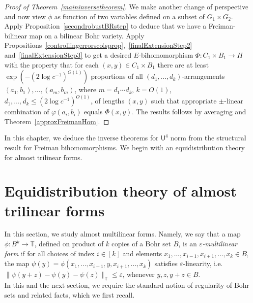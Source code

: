 \documentclass[a4paper,11pt]{article}
\numberwithin{theorem}{section}
\theoremstyle{definition}
\begin{document}
\begin{proof}[Proof of Theorem~\ref{maininversetheorem}]
    We make another change of perspective and now view $\phi$ as function of two variables defined on a subset of $G_1 \times G_2$. Apply Proposition~\ref{secondrobustBRstep} to deduce that we have a Freiman-bilinear map on a bilinear Bohr variety. Apply Propositions~\ref{controllingerrorscolsprop},~\ref{finalExtensionStep2} and~\ref{finalExtensionStep3} to get a desired $E$-bihomomorphism $\Phi : C_1 \times B_1 \to H$ with the property that for each $(x,y) \in C_1 \times B_1$ there are at least $\exp(-(2\log c^{-1})^{O(1)})$ proportions of all $(d_1, \dots, d_k)$-arrangements $(a_1, b_1), \dots, (a_m, b_m)$, where $m = d_1 \cdots d_k$, $k = O(1)$, $d_1, \dots, d_k \leq (2\log c^{-1})^{O(1)}$, of lengths $(x,y)$ such that appropriate $\pm$-linear combination of $\varphi(a_i, b_i)$ equals $\Phi(x,y)$. The results follows by averaging and Theorem~\ref{approxFreimanHom}.
\end{proof}


\pagebreak

\begin{center}
\end{center}\normalsize

In this chapter, we deduce the inverse theorems for $\mathsf{U}^4$ norm from the structural result for Freiman bihomomorphisms. We begin with an equidistribution theory for almost trilinear forms.


\section{Equidistribution theory of almost trilinear forms}\label{sectionequidistributiontheory}

In this section, we study almost multilinear forms. Namely, we say that a map $\phi : B^k \to \mathbb{T}$, defined on product of $k$ copies of a Bohr set $B$, is an \textit{$\varepsilon$-multilinear form} if for all choices of index $i \in [k]$ and elements $x_1, \dots, x_{i-1}, x_{i+1}, \dots, x_k \in B$, the map $\psi(y) = \phi(x_1, \dots, x_{i -1}, y, x_{i + 1}, \dots, x_k)$ satisfies $\varepsilon$-linearity, i.e. $\|\psi(y + z) - \psi(y) - \psi(z)\|_{\mathbb{T}} \leq \varepsilon$, whenever $y,z,y+z \in B$.\\

In this and the next section, we require the standard notion of regularity of Bohr sets and related facts, which we first recall.\\
\end{document}
